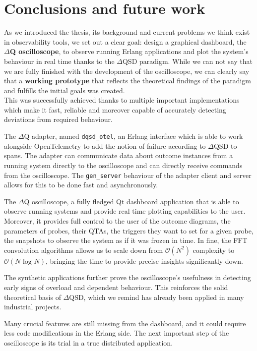 \chapter{Conclusions and future work}

    As we introduced the thesis, its background and current problems we think exist in observability tools, we set out a clear goal: design a graphical dashboard, the \textbf{$\Delta$Q oscilloscope}, to observe running Erlang applications and plot the system's behaviour in real time thanks to the $\Delta$QSD paradigm.
    While we can not say that we are fully finished with the development of the oscilloscope, we can clearly say that a \textbf{working prototype} that reflects the theoretical findings of the paradigm and fulfills the initial goals was created. \\
    This was successfully achieved thanks to multiple important implementations which make it fast, reliable and moreover capable of accurately detecting deviations from required behaviour.
    
    The $\Delta$Q adapter, named \texttt{dqsd\_otel}, an Erlang interface which is able to work alongside OpenTelemetry to add the notion of failure according to $\Delta$QSD to spans. The adapter can communicate data about outcome instances from a running system directly to the oscilloscope and can directly receive commands from the oscilloscope. The \texttt{gen\_server} behaviour of the adapter client and server allows for this to be done fast and asynchronously.


    The $\Delta$Q oscilloscope, a fully fledged Qt dashboard application that is able to observe running systems and provide real time plotting capabilities to the user. Moreover, it provides full control to the user of the outcome diagrams, the parameters of probes, their QTAs, the triggers they want to set for a given probe, the snapshots to observe the system as if it was frozen in time. In fine, the FFT convolution algorithms allows us to scale down from $\mathcal{O}(N^2)$ complexity to $\mathcal{O}(N\text{ log }N)$, bringing the time to provide precise insights significantly down.

    The synthetic applications further prove the oscilloscope's usefulness in detecting early signs of overload and dependent behaviour. This reinforces the solid theoretical basis of $\Delta$QSD, which we remind has already been applied in many industrial projects.

    Many crucial features are still missing from the dashboard, and it could require less code modifications in the Erlang side. The next important step of the oscilloscope is its trial in a true distributed application.

